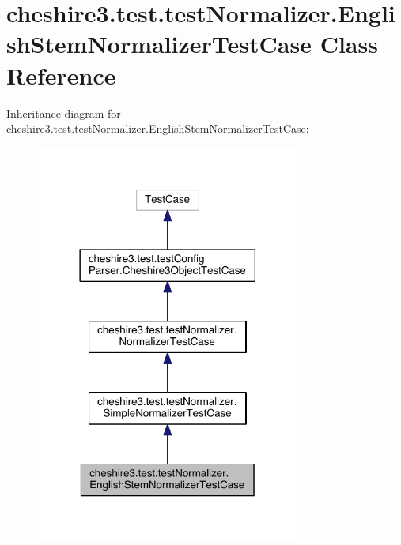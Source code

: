 \hypertarget{classcheshire3_1_1test_1_1test_normalizer_1_1_english_stem_normalizer_test_case}{\section{cheshire3.\-test.\-test\-Normalizer.\-English\-Stem\-Normalizer\-Test\-Case Class Reference}
\label{classcheshire3_1_1test_1_1test_normalizer_1_1_english_stem_normalizer_test_case}
}


Inheritance diagram for cheshire3.\-test.\-test\-Normalizer.\-English\-Stem\-Normalizer\-Test\-Case\-:
\nopagebreak
\begin{figure}[H]
\begin{center}
\leavevmode
\includegraphics[width=246pt]{classcheshire3_1_1test_1_1test_normalizer_1_1_english_stem_normalizer_test_case__inherit__graph}
\end{center}
\end{figure}


